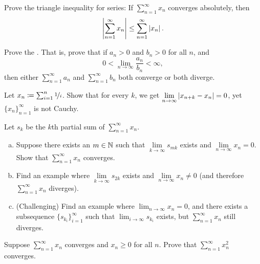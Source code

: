 \begin{exercise}
Prove the triangle inequality for series:
If $\sum_{n=1}^\infty x_n$ converges absolutely, then
\begin{equation*}
\left\lvert {\sum_{n=1}^\infty x_n} \right\rvert \leq
\sum_{n=1}^\infty \left\lvert {x_n} \right\rvert .
\end{equation*}
\end{exercise}

\begin{exercise}
Prove the \emph{}.  That is, prove that if
$a_n > 0$ and $b_n > 0$ for all $n$, and
\begin{equation*}
0 < \lim_{n\to\infty} \frac{a_n}{b_n} < \infty ,
\end{equation*}
then either $\sum_{n=1}^\infty a_n$ and $\sum_{n=1}^\infty b_n$ both converge or both diverge.
\end{exercise}

\begin{exercise} \label{exercise:badnocauchy}
Let $x_n \coloneqq \sum_{i=1}^n \nicefrac{1}{i}$.  Show that for every $k$,
we get
$\displaystyle \lim_{n\to\infty} \left\lvert {x_{n+k}-x_n} \right\rvert = 0$, yet
$\{ x_n \}_{n=1}^\infty$ is not Cauchy.
\end{exercise}

\begin{samepage}
\begin{exercise}
Let $s_k$ be the $k$th partial sum of $\sum_{n=1}^\infty x_n$.
\begin{enumerate}[a)]
\item
Suppose there exists an $m \in {\mathbb{N}}$ such that $\lim\limits_{k\to\infty}
s_{mk}$ exists and $\lim\limits_{n\to\infty} x_n = 0$.  Show that
$\sum_{n=1}^\infty x_n$ converges.
\item
Find an example where $\lim\limits_{k\to\infty} s_{2k}$ exists and
$\lim\limits_{n\to\infty} x_n \not= 0$ (and therefore $\sum_{n=1}^\infty x_n$ diverges).
\item
(Challenging) Find an example where $\lim_{n\to\infty} x_n = 0$, and there exists
a subsequence $\{ s_{k_i} \}_{i=1}^\infty$ such that $\displaystyle \lim_{i\to\infty} s_{k_i}$ exists,
but $\sum_{n=1}^\infty x_n$ still diverges.
\end{enumerate}
\end{exercise}
\end{samepage}

\begin{exercise} \label{exercise:squareseriesconv}
Suppose $\sum_{n=1}^\infty x_n$ converges and $x_n \geq 0$ for all $n$.
Prove that $\sum_{n=1}^\infty x_n^2$ converges.
\end{exercise}

